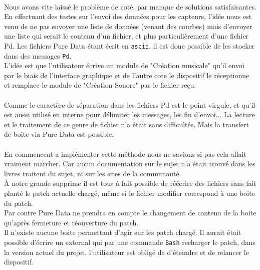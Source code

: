 \documentclass[a4paper, titlepage, oneside, 12pt]{article}%
\begin{document}
\paragraph{}
Nous avons vite laissé le problème de coté, par manque de solutions satisfaisantes.\\
En effectuant des testes sur l'envoi des données pour les capteurs, l'idée nous est venu de ne pas envoyer une liste de données (venant des courbes) mais d'envoyer une liste qui serait le contenu d'un fichier, et plus particulièrement d'une fichier Pd. Les fichiers Pure Data étant écrit en \texttt{ascii}, il est donc possible de les stocker dans des messages \texttt{Pd}.\\
L'idée est que l’utilisateur écrive un module de "Création musicale" qu'il envoi par le biais de l'interface graphique et de l'autre cote le dispositif le réceptionne et remplace le module de "Création Sonore" par le fichier reçu.
\paragraph{}
Comme le caractère de séparation dans les fichiers Pd est le point virgule, et qu'il est aussi utilisé en interne pour délimiter les messages, les fin d'envoi... La lecture et le traitement de ce genre de fichier n'a était sans difficultés, Mais la transfert de boite via Pure Data est possible.
\paragraph{}
En commencent a implémenter cette méthode nous ne savions si pas cela allait vraiment marcher. Car aucun documentation sur le sujet n'a était trouvé dans les livres traitent du sujet, ni sur les sites de la communauté.\\
À notre grande supprime il est tous à fait possible de réécrire des fichiers sans fait planté le patch actuelle chargé, même si le fichier modifier correspond à une boite du patch.\\
Par contre Pure Data ne prendra en compte le changement de contenu de la boite qu’après fermeture et réouverture du patch.\\
Il n'existe aucune boite permettant d’agir sur les patch chargé. Il aurait était possible d’écrire un external qui par une commande \texttt{Bash} recharger le patch, dans la version actuel du projet, l'utilisateur est obligé de d'éteindre et de relancer le dispositif.
\end{document}
